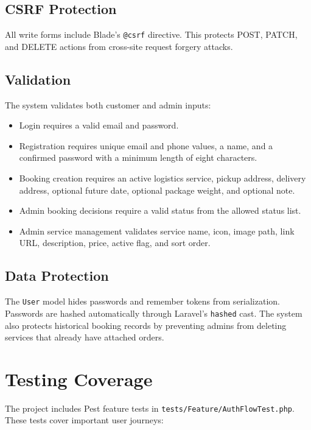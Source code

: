 \documentclass[12pt,a4paper]{report}
\begin{document}
\section{CSRF Protection}

All write forms include Blade's \texttt{@csrf} directive. This protects POST, PATCH, and DELETE actions from cross-site request forgery attacks.

\section{Validation}

The system validates both customer and admin inputs:

\begin{itemize}
    \item Login requires a valid email and password.
    \item Registration requires unique email and phone values, a name, and a confirmed password with a minimum length of eight characters.
    \item Booking creation requires an active logistics service, pickup address, delivery address, optional future date, optional package weight, and optional note.
    \item Admin booking decisions require a valid status from the allowed status list.
    \item Admin service management validates service name, icon, image path, link URL, description, price, active flag, and sort order.
\end{itemize}

\section{Data Protection}

The \texttt{User} model hides passwords and remember tokens from serialization. Passwords are hashed automatically through Laravel's \texttt{hashed} cast. The system also protects historical booking records by preventing admins from deleting services that already have attached orders.

\chapter{Testing Coverage}

The project includes Pest feature tests in \texttt{tests/Feature/AuthFlowTest.php}. These tests cover important user journeys:
\end{document}
